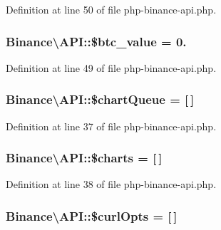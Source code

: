 Definition at line 50 of file php-\/binance-\/api.\-php.

\hypertarget{classBinance_1_1API_af80ef162a101ffa0963d977126d6811d}{
\subsubsection[{\$btc\-\_\-value}]{\setlength{\rightskip}{0pt plus 5cm}Binance\textbackslash{}\-A\-P\-I\-::\$btc\-\_\-value = 0.}}\label{classBinance_1_1API_af80ef162a101ffa0963d977126d6811d}


Definition at line 49 of file php-\/binance-\/api.\-php.

\hypertarget{classBinance_1_1API_aaa75d873054290eecf1dd2876237a279}{
\subsubsection[{\$chart\-Queue}]{\setlength{\rightskip}{0pt plus 5cm}Binance\textbackslash{}\-A\-P\-I\-::\$chart\-Queue = \mbox{[}$\,$\mbox{]}\hspace{0.3cm}{\ttfamily [protected]}}}\label{classBinance_1_1API_aaa75d873054290eecf1dd2876237a279}


Definition at line 37 of file php-\/binance-\/api.\-php.

\hypertarget{classBinance_1_1API_a0c2d0cd199527b3b275143c49d91702e}{
\subsubsection[{\$charts}]{\setlength{\rightskip}{0pt plus 5cm}Binance\textbackslash{}\-A\-P\-I\-::\$charts = \mbox{[}$\,$\mbox{]}\hspace{0.3cm}{\ttfamily [protected]}}}\label{classBinance_1_1API_a0c2d0cd199527b3b275143c49d91702e}


Definition at line 38 of file php-\/binance-\/api.\-php.

\hypertarget{classBinance_1_1API_ace9645947686e99baf916e3bc189aeaf}{
\subsubsection[{\$curl\-Opts}]{\setlength{\rightskip}{0pt plus 5cm}Binance\textbackslash{}\-A\-P\-I\-::\$curl\-Opts = \mbox{[}$\,$\mbox{]}\hspace{0.3cm}{\ttfamily [protected]}}}\label{classBinance_1_1API_ace9645947686e99baf916e3bc189aeaf}


